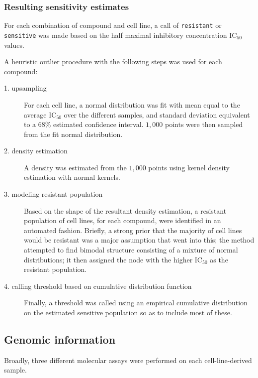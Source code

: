 \subsubsection{Resulting sensitivity estimates}

For each combination of compound and cell line, a call of
\texttt{resistant} or \texttt{sensitive} was made based on the
half maximal inhibitory concentration $\text{IC}_{50}$ values.

A heuristic outlier procedure with the following steps was used for
each compound:

\begin{description}
\item[1. upsampling]
  For each cell line, a normal distribution was fit with mean equal to
  the average $\text{IC}_{50}$ over the different samples, and
  standard deviation equivalent to a $68\%$ estimated confidence
  interval. $1,000$ points were then sampled from the fit normal
  distribution.

  
\item[2. density estimation]
  A density was estimated from the $1,000$ points using kernel
  density estimation with normal kernels.

  
\item[3. modeling resistant population]
  Based on the shape of the resultant density estimation, a resistant population of cell lines, for each compound, were
  identified in an automated fashion. Briefly, a strong prior that the
  majority of cell lines would be resistant was a major assumption
  that went into this; the method attempted to find bimodal structure
  consisting of a mixture of normal distributions; it then assigned
  the node with the higher $\text{IC}_{50}$ as the resistant
  population. 

  
\item[4. calling threshold based on cumulative distribution function]
  Finally, a threshold was called using an empirical cumulative distribution on the estimated
  sensitive population so as to include most of these. 
\end{description}



\subsection{Genomic information}

Broadly, three different molecular assays were performed on each
cell-line-derived sample. 

